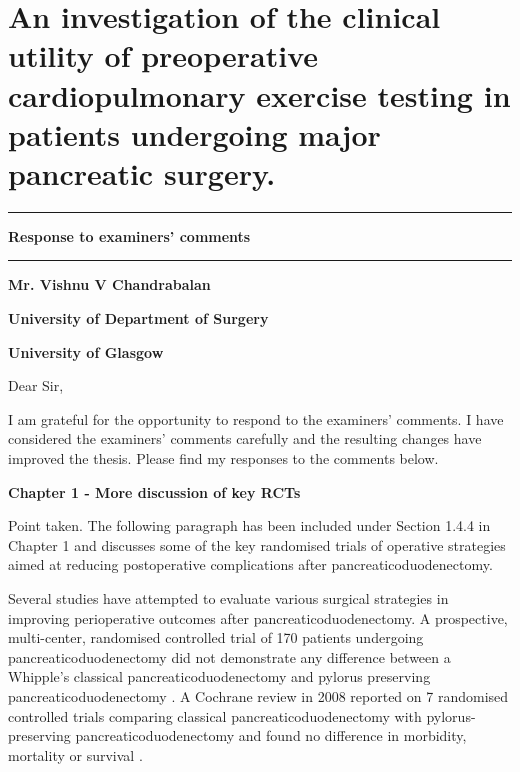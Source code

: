 
\chapter*{An investigation of the clinical utility of preoperative cardiopulmonary exercise testing in patients undergoing major pancreatic surgery.}


\vfill

\hrule
\vfill
{\LARGE \textbf{Response to examiners' comments}}
\vfill
\hrule

\vfill

\textbf{Mr. Vishnu V Chandrabalan}

\textbf{University of Department of Surgery}

\textbf{University of Glasgow}

\vfill

\clearpage
Dear Sir,
	
I am grateful for the opportunity to respond to the examiners' comments. 
I have considered the examiners' comments carefully and the resulting changes have improved the thesis. 
Please find my responses to the comments below.
	
\textbf{Chapter 1 - More discussion of key RCTs}

	Point taken.	
	The following paragraph has been included under Section 1.4.4 in Chapter 1 and discusses some of the key randomised trials of operative strategies aimed at reducing postoperative complications after pancreaticoduodenectomy.
	
	Several studies have attempted to evaluate various surgical strategies in improving perioperative outcomes after pancreaticoduodenectomy. 
	A prospective, multi-center, randomised controlled trial of 170 patients undergoing pancreaticoduodenectomy did not demonstrate any difference between a Whipple's classical pancreaticoduodenectomy  and pylorus preserving pancreaticoduodenectomy \parencite{tran_pylorus_2004}. 
	A Cochrane review in 2008 reported on 7 randomised controlled trials comparing classical pancreaticoduodenectomy with pylorus-preserving pancreaticoduodenectomy  and found no difference in morbidity, mortality or survival \parencite{diener_pancreaticoduodenectomy_2008}. 
	
